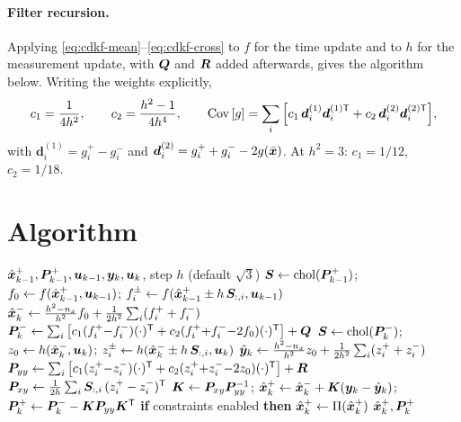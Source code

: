 \paragraph{Filter recursion.} Applying \eqref{eq:cdkf-mean}--\eqref{eq:cdkf-cross} to $f$ for
the time update and to $h$ for the measurement update, with $\bm{Q}$ and $\bm{R}$ added afterwards,
gives the algorithm below. Writing the weights explicitly,
\begin{equation}
c_1 = \frac{1}{4h^2}, \qquad c_2 = \frac{h^2-1}{4h^4}, \qquad
\operatorname{Cov}\left[g\right] = \sum_{i}\Big[c_1\,\bm{d}^{(1)}_i\bm{d}^{(1)\mathsf{T}}_i + c_2\,\bm{d}^{(2)}_i\bm{d}^{(2)\mathsf{T}}_i\Big],
\label{eq:cdkf-weights}
\end{equation}
with $\bm{d}^{(1)}_i = g_i^+-g_i^-$ and $\bm{d}^{(2)}_i = g_i^++g_i^--2g(\bar{\bm{x}})$. At
$h^2=3$: $c_1 = 1/12$, $c_2 = 1/18$.

\section{Algorithm}
\begin{algorithm}[H]
\caption{CDKF/DD2 --- one sampling period (additive noise)}
\begin{algorithmic}[1]
\Require $\hat{\bm{x}}^{+}_{k-1},\bm{P}^{+}_{k-1},\bm{u}_{k-1},\bm{y}_k,\bm{u}_k$, step $h$ (default $\sqrt3$)
\State $\bm{S}\gets\operatorname{chol}(\bm{P}^{+}_{k-1})$;\;
       $f_0\gets f(\hat{\bm{x}}^{+}_{k-1},\bm{u}_{k-1})$;\;
       $f_i^{\pm}\gets f(\hat{\bm{x}}^{+}_{k-1}\pm h\,\bm{S}_{:,i},\bm{u}_{k-1})$
\State $\hat{\bm{x}}^{-}_k\gets\frac{h^2-n_x}{h^2}f_0+\frac{1}{2h^2}\sum_i(f_i^++f_i^-)$
\State $\bm{P}^{-}_k\gets\sum_i\left[c_1(f_i^+{-}f_i^-)(\cdot)^{\mathsf{T}}+c_2(f_i^+{+}f_i^-{-}2f_0)(\cdot)^{\mathsf{T}}\right]+\bm{Q}$
\State $\bm{S}\gets\operatorname{chol}(\bm{P}^{-}_k)$;\;
       $z_0\gets h(\hat{\bm{x}}^{-}_k,\bm{u}_k)$;\; $z_i^\pm\gets h(\hat{\bm{x}}^{-}_k\pm h\,\bm{S}_{:,i},\bm{u}_k)$
\State $\hat{\bm{y}}_k\gets\frac{h^2-n_x}{h^2}z_0+\frac{1}{2h^2}\sum_i(z_i^++z_i^-)$
\State $\bm{P}_{yy}\gets\sum_i\left[c_1(z_i^+{-}z_i^-)(\cdot)^{\mathsf{T}}+c_2(z_i^+{+}z_i^-{-}2z_0)(\cdot)^{\mathsf{T}}\right]+\bm{R}$
\State $\bm{P}_{xy}\gets\frac{1}{2h}\sum_i \bm{S}_{:,i}\,(z_i^+-z_i^-)^{\mathsf{T}}$
\State $\bm{K}\gets\bm{P}_{xy}\bm{P}_{yy}^{-1}$;\; $\hat{\bm{x}}^{+}_k\gets\hat{\bm{x}}^{-}_k+\bm{K}(\bm{y}_k-\hat{\bm{y}}_k)$;\;
       $\bm{P}^{+}_k\gets\bm{P}^{-}_k-\bm{K}\bm{P}_{yy}\bm{K}^{\mathsf{T}}$
\State \textbf{if} constraints enabled \textbf{then} $\hat{\bm{x}}^{+}_k\gets\Pi(\hat{\bm{x}}^{+}_k)$
\Ensure $\hat{\bm{x}}^{+}_k,\bm{P}^{+}_k$
\end{algorithmic}
\end{algorithm}

